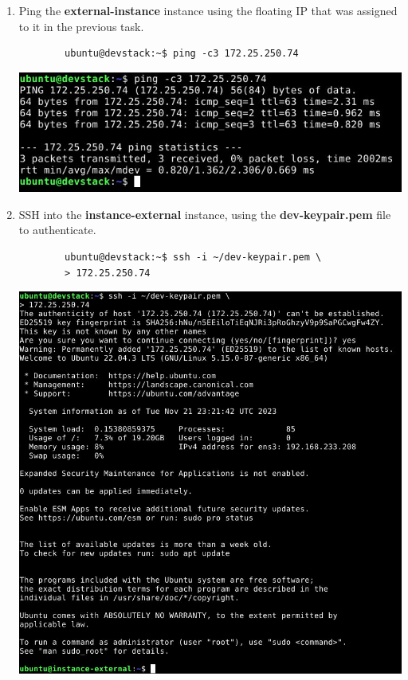 \documentclass[letterpaper, 12pt]{article}
\begin{document}
\begin{enumerate}
    \item Ping the \textbf{external-instance} instance using the floating IP that was assigned to it in the previous
    task.
    \begin{lstlisting}
        ubuntu@devstack:~$ ping -c3 172.25.250.74
    \end{lstlisting}

    \begin{center}
        \includegraphics[width=\linewidth]{images/part6/step4.png}
    \end{center}

    \item SSH into the \textbf{instance-external} instance, using the \textbf{dev-keypair.pem} file to authenticate.
    \begin{lstlisting}
        ubuntu@devstack:~$ ssh -i ~/dev-keypair.pem \
        > 172.25.250.74
    \end{lstlisting}
 
    \begin{center}
        \includegraphics[width=\linewidth]{images/part6/step5.png}
    \end{center}


\end{enumerate}
\end{document}
